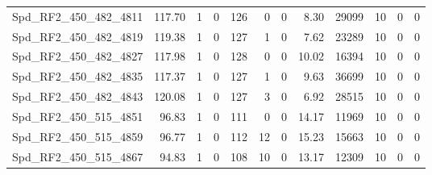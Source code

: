 \begin{longtable}[c]{@{}lrrrrrrrrrrr@{}}
Spd\_RF2\_450\_482\_4811     & 117.70                 & 1                       & 0                       & 126                    & 0                       & 0                       & 8.30                    & 29099                    & 10                       & 0                        & 0                        \\
Spd\_RF2\_450\_482\_4819     & 119.38                 & 1                       & 0                       & 127                    & 1                       & 0                       & 7.62                    & 23289                    & 10                       & 0                        & 0                        \\
Spd\_RF2\_450\_482\_4827     & 117.98                 & 1                       & 0                       & 128                    & 0                       & 0                       & 10.02                   & 16394                    & 10                       & 0                        & 0                        \\
Spd\_RF2\_450\_482\_4835     & 117.37                 & 1                       & 0                       & 127                    & 1                       & 0                       & 9.63                    & 36699                    & 10                       & 0                        & 0                        \\
Spd\_RF2\_450\_482\_4843     & 120.08                 & 1                       & 0                       & 127                    & 3                       & 0                       & 6.92                    & 28515                    & 10                       & 0                        & 0                        \\
Spd\_RF2\_450\_515\_4851     & 96.83                  & 1                       & 0                       & 111                    & 0                       & 0                       & 14.17                   & 11969                    & 10                       & 0                        & 0                        \\
Spd\_RF2\_450\_515\_4859     & 96.77                  & 1                       & 0                       & 112                    & 12                      & 0                       & 15.23                   & 15663                    & 10                       & 0                        & 0                        \\
Spd\_RF2\_450\_515\_4867     & 94.83                  & 1                       & 0                       & 108                    & 10                      & 0                       & 13.17                   & 12309                    & 10                       & 0                        & 0                        \\

\end{longtable}
